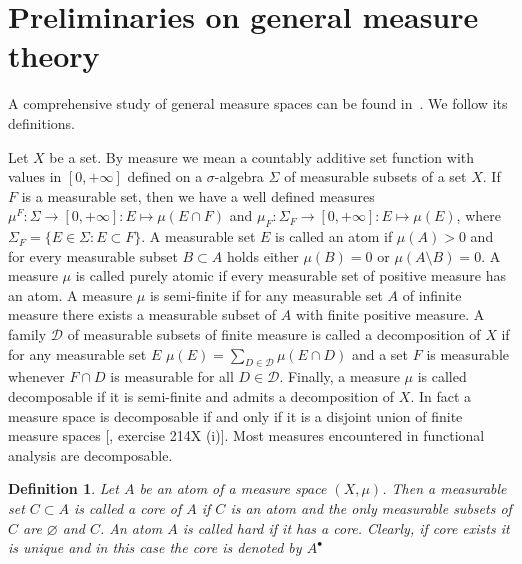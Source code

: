 \documentclass[12pt]{article}
\newtheorem{definition}[theorem]{Definition}
\begin{document}
\section{Preliminaries on general measure
  theory}\label{SectionPreliminariesOnGeneralMeasureTheory}

A comprehensive study of general measure spaces can be found
in~\cite{FremMeasTh2}. We follow its definitions.

Let $X$ be a set. By measure we mean a countably additive set function with
values in $[0,+\infty]$ defined on a $\sigma$-algebra $\Sigma$ of measurable
subsets of a set $X$. If $F$ is a measurable set, then we have a well defined
measures $\mu^F:\Sigma\to[0,+\infty]:E\mapsto \mu(E\cap F)$ and
$\mu_F:\Sigma_F\to[0,+\infty]: E\mapsto \mu(E)$, where
$\Sigma_F=\{E\in\Sigma:E\subset F\}$. A measurable set $E$ is called an atom if
$\mu(A)>0$ and for every measurable subset $B\subset A$ holds either $\mu(B)=0$
or $\mu(A\setminus B)=0$. A measure $\mu$ is called purely atomic if every
measurable set of positive measure has an atom. A measure $\mu$ is semi-finite
if for any measurable set $A$ of infinite measure there exists a measurable
subset of $A$ with finite positive measure. A family $\mathcal{D}$ of measurable
subsets of finite measure is called a decomposition of $X$ if for any measurable
set $E$ $\mu(E)=\sum_{D\in\mathcal{D}}\mu(E\cap D)$ and a set $F$ is measurable
whenever $F\cap D$ is measurable for all $D\in\mathcal{D}$. Finally, a measure
$\mu$ is called decomposable if it is semi-finite and admits a decomposition of
$X$. In fact a measure space is decomposable if and only if it is a disjoint
union of finite measure spaces [\cite{FremMeasTh2}, exercise 214X (i)]. Most
measures encountered in functional analysis are decomposable.

\begin{definition}\label{AtomCore} Let $A$ be an atom of a measure space
    $(X,\mu)$. Then a measurable set $C\subset A$ is called a core of $A$ if $C$
    is an atom and the only measurable subsets of $C$ are $\varnothing$ and $C$.
    An atom $A$ is called hard if it has a core. Clearly, if core exists it is
    unique and in this case the core is denoted by $A^\bullet$
\end{definition}
\end{document}
